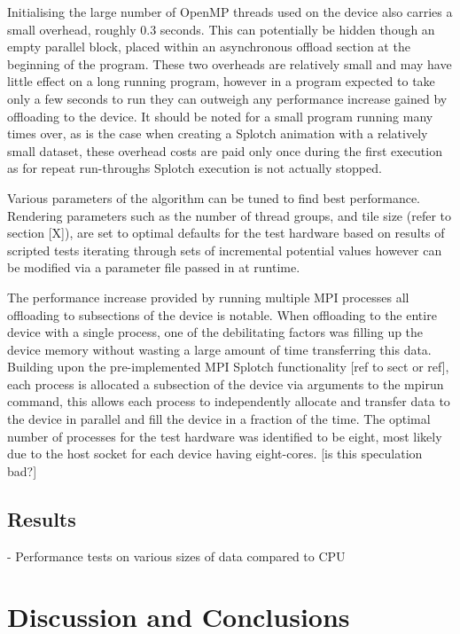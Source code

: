 \documentclass[runningheads,a4paper]{llncs}
\begin{document}
Initialising the large number of OpenMP threads used on the device also carries a small overhead, roughly 0.3 seconds. 
This can potentially be hidden though an empty parallel block, placed within an asynchronous offload section at the 
beginning of the program. These two overheads are relatively small and may have little effect on a long running program, 
however in a program expected to take only a few seconds to run they can outweigh any performance increase gained by 
offloading to the device. It should be noted for a small program running many times over, as is the case when creating 
a Splotch animation with a relatively small dataset, these overhead costs are paid only once during the first execution 
as for repeat run-throughs Splotch execution is not actually stopped.

Various parameters of the algorithm can be tuned to find best performance. Rendering parameters such as the number of 
thread groups, and tile size (refer to section [X]), are set to optimal defaults for the test hardware based on results 
of scripted tests iterating through sets of incremental potential values however can be modified via a parameter file 
passed in at runtime.

The performance increase provided by running multiple MPI processes all offloading to subsections of the device is 
notable. When offloading to the entire device with a single process, one of the debilitating factors was filling up 
the device memory without wasting a large amount of time transferring this data. Building upon the pre-implemented MPI 
Splotch functionality [ref to sect or ref], each process is allocated a subsection of the device via arguments to the 
mpirun command, this  allows each process to independently allocate and transfer data to the device in parallel and 
fill the device in a fraction of the time. The optimal number of processes for the test hardware was identified to be 
eight, most likely due to the host socket for each device having eight-cores. [is this speculation bad?] 

\subsection{Results}
\label{sect:results}

\noindent
- Performance tests on various sizes of data compared to CPU

\section{Discussion and Conclusions}
\label{sect:conclusions}
\end{document}
